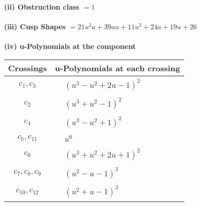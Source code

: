 \documentclass[1p]{elsarticle_modified}
\theoremstyle{definition}
\begin{document}
\flushleft \textbf{(ii) Obstruction class $= 1$}\\~\\
\flushleft \textbf{(iii) Cusp Shapes $= 21 u^2 a+39 a u+11 u^2+24 a+19 u+26$}\\~\\
\newpage\renewcommand{\arraystretch}{1}
\flushleft \textbf{(iv) u-Polynomials at the component}\newline \\
\begin{tabular}{m{50pt}|m{274pt}}
Crossings & \hspace{64pt}u-Polynomials at each crossing \\
\hline $$\begin{aligned}c_{1},c_{3}\end{aligned}$$&$\begin{aligned}
&(u^3- u^2+2 u-1)^2
\end{aligned}$\\
\hline $$\begin{aligned}c_{2}\end{aligned}$$&$\begin{aligned}
&(u^3+u^2-1)^2
\end{aligned}$\\
\hline $$\begin{aligned}c_{4}\end{aligned}$$&$\begin{aligned}
&(u^3- u^2+1)^2
\end{aligned}$\\
\hline $$\begin{aligned}c_{5},c_{11}\end{aligned}$$&$\begin{aligned}
&u^6
\end{aligned}$\\
\hline $$\begin{aligned}c_{6}\end{aligned}$$&$\begin{aligned}
&(u^3+u^2+2 u+1)^2
\end{aligned}$\\
\hline $$\begin{aligned}c_{7},c_{8},c_{9}\end{aligned}$$&$\begin{aligned}
&(u^2- u-1)^3
\end{aligned}$\\
\hline $$\begin{aligned}c_{10},c_{12}\end{aligned}$$&$\begin{aligned}
&(u^2+u-1)^3
\end{aligned}$\\
\hline
\end{tabular}\\~\\
\end{document}
